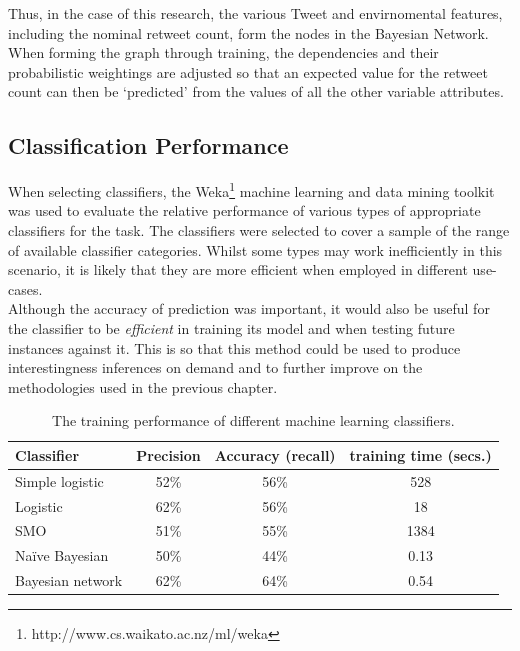 Thus, in the case of this research, the various Tweet and envirnomental features, including the nominal retweet count, form the nodes in the Bayesian Network. When forming the graph through training, the dependencies and their probabilistic weightings are adjusted so that an expected value for the retweet count can then be `predicted' from the values of all the other variable attributes.


\subsection{Classification Performance}
When selecting classifiers, the Weka\footnote{http://www.cs.waikato.ac.nz/ml/weka} machine learning and data mining toolkit was used to evaluate the relative performance of various types of appropriate classifiers for the task. The classifiers were selected to cover a sample of the range of available classifier categories. Whilst some types may work inefficiently in this scenario, it is likely that they are more efficient when employed in different use-cases.\\
Although the accuracy of prediction was important, it would also be useful for the classifier to be \textit{efficient} in training its model and when testing future instances against it. This is so that this method could be used to produce interestingness inferences on demand and to further improve on the methodologies used in the previous chapter.

\begin{table}[h]\footnotesize
\begin{center}
\begin{tabular}{ l | c | c | c }
	Classifier	& Precision & Accuracy (recall) &  training time (secs.) \\
	\hline
	\hline 
	Simple logistic & 52\% &  56\% & 528\\
    Logistic        & 62\% &  56\% & 18\\
    SMO             & 51\% &  55\% & 1384\\
    Na\"{i}ve Bayesian & 50\% & 44\% & 0.13\\
    Bayesian network & 62\%&  64\% & 0.54\\
    \hline  
\end{tabular}
\end{center}
\caption{The training performance of different machine learning classifiers.}
\label{table:classifierperformance}
\end{table}


